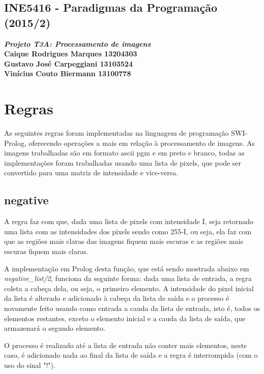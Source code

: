\documentclass{article}
\begin{document}
\lstset{language=Prolog} %

\begin{center} 
    \section*{INE5416 - Paradigmas da Programação (2015/2)}
    \textbf{\textit{Projeto T3A: Processamento de imagens} \\
    Caique Rodrigues Marques 13204303 \\ 
    Gustavo José Carpeggiani 13103524 \\
    Vinícius Couto Biermann  13100778}
\end{center}

\section*{Regras}
    As seguintes regras foram implementadas na linguagem de programação
    SWI-Prolog, oferecendo operações a mais em relação à processamento de
    imagens. As imagens trabalhadas são em formato ascii pgm e em preto e
    branco, todas as implementações foram trabalhadas usando uma lista de
    pixels, que pode ser convertido para uma matriz de intensidade e
    vice-versa.
    
    \subsection*{negative}
        A regra faz com que, dada uma lista de pixels com intensidade I, seja
        retornado uma lista com as intensidades dos pixels sendo como 255-I, ou
        seja, ela faz com que as regiões mais claras das imagens fiquem mais
        escuras e as regiões mais escuras fiquem mais claras.

        A implementação em Prolog desta função, que está sendo mostrada abaixo
        em \textit{negative\_list/2}, funciona da seguinte forma: dada uma
        lista de entrada, a regra coleta a cabeça dela, ou seja, o primeiro
        elemento. A intensidade do pixel inicial da lista é alterado e
        adicionado à cabeça da lista de saída e o processo é novamente feito
        usando como entrada a cauda da lista de entrada, isto é, todos os
        elementos restantes, exceto o elemento inicial e a cauda da lista de
        saída, que armazenará o segundo elemento.

        O processo é realizado até a lista de entrada não conter mais
        elementos, neste caso, é adicionado nada ao final da lista de saída e a
        regra é interrompida (com o uso do sinal "!").
\end{document}
